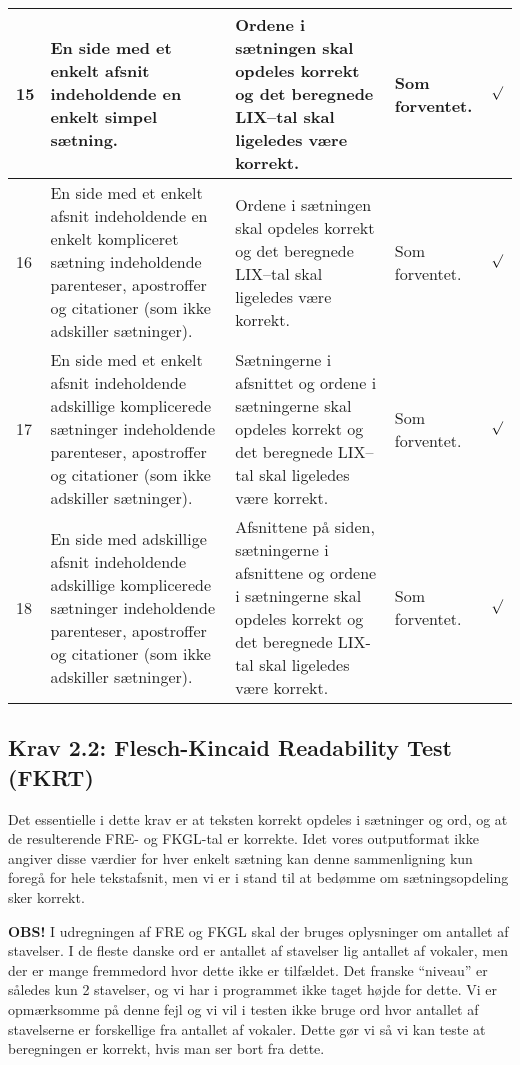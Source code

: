 \documentclass[a4paper,oneside,article]{memoir}
\begin{document}
\begin{landscape}
\begin{longtable}[c]{p{20pt}|p{220pt}|p{130pt}|p{130pt}|p{50pt}}
15 & 
En side med et enkelt afsnit indeholdende en enkelt simpel sætning. &
Ordene i sætningen skal opdeles korrekt og det beregnede LIX--tal skal
ligeledes være korrekt. &
Som forventet. &
$\surd$ \\ \hline

16 & 
En side med et enkelt afsnit indeholdende en enkelt kompliceret
sætning indeholdende parenteser, apostroffer og citationer (som ikke
adskiller sætninger). &
Ordene i sætningen skal opdeles korrekt og det beregnede LIX--tal skal
ligeledes være korrekt. &
Som forventet. &
$\surd$ \\ \hline

17 &
En side med et enkelt afsnit indeholdende adskillige
komplicerede sætninger indeholdende parenteser, apostroffer og
citationer (som ikke adskiller sætninger). &
Sætningerne i afsnittet og ordene i sætningerne skal opdeles korrekt
og det beregnede LIX--tal skal ligeledes være korrekt. &
Som forventet. &
$\surd$ \\ \hline

18 &
En side med adskillige afsnit indeholdende adskillige
komplicerede sætninger indeholdende parenteser, apostroffer og
citationer (som ikke adskiller sætninger). &
Afsnittene på siden, sætningerne i afsnittene og ordene i sætningerne
skal opdeles korrekt og det beregnede LIX-tal skal ligeledes være korrekt. &
Som forventet. &
$\surd$ \\ \hline

\end{longtable}

\subsection{Krav 2.2: Flesch-Kincaid Readability Test (FKRT)}
Det essentielle i dette krav er at teksten korrekt opdeles i sætninger
og ord, og at de resulterende FRE- og FKGL-tal er korrekte. Idet vores
outputformat ikke angiver disse værdier for hver enkelt sætning kan
denne sammenligning kun foregå for hele tekstafsnit, men vi er i stand
til at bedømme om sætningsopdeling sker korrekt.


\textbf{OBS!} I udregningen af FRE og FKGL skal der bruges oplysninger
om antallet af stavelser. I de fleste danske ord er antallet af
stavelser lig antallet af vokaler, men der er mange fremmedord hvor
dette ikke er tilfældet. Det franske ``niveau'' er således kun 2
stavelser, og vi har i programmet ikke taget højde for dette. Vi er
opmærksomme på denne fejl og vi vil i testen ikke bruge ord hvor
antallet af stavelserne er forskellige fra antallet af vokaler. Dette
gør vi så vi kan teste at beregningen er korrekt, hvis man ser bort
fra dette.


\end{landscape}
\end{document}
